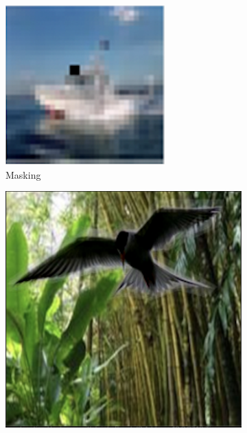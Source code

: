 \begin{figure}[t]
\vskip 0.2in
\begin{center}
\begin{subfigure}[b]{0.2\textwidth}
  \includegraphics[width=0.99\linewidth]{plotsAistats/CIFAR10_class_boat.png}
  \caption{Masking}
  \label{fig:CIFAR10_boat}
\end{subfigure}
\begin{subfigure}[b]{0.2\textwidth}
  \includegraphics[width=0.99\linewidth]{plotsAistats/light_darker.png}

\end{subfigure}
\end{center}
\end{figure}

